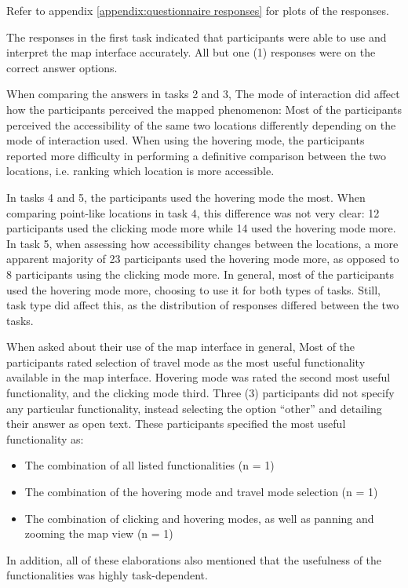 Refer to appendix \ref{appendix:questionnaire responses} for plots of the responses.

The responses in the first task indicated that participants were
able to use and interpret the map interface accurately.
All but one (1) responses
were on the correct answer options.

When comparing the answers in tasks 2 and 3,
The mode of interaction did affect how the participants perceived the mapped phenomenon:
Most of the participants perceived
the accessibility of the same two locations
differently depending on the mode of interaction used.
When using the hovering mode, the participants reported more difficulty in
performing a definitive comparison between the two locations,
i.e. ranking which location is more accessible.

In tasks 4 and 5,
the participants used the hovering mode the most.
When comparing point-like locations in task 4,
this difference was not very clear:
12 participants used the clicking mode more while 14 used the hovering mode more.
In task 5, when assessing how accessibility changes between the locations,
a more apparent majority of 23 participants used the hovering mode more,
as opposed to 8 participants using the clicking mode more.
In general,
most of the participants used the hovering mode more,
choosing to use it for both types of tasks.
Still,
task type did affect this,
as the distribution of responses differed between the two tasks.

When asked about their use of the map interface in general,
Most of the participants rated selection of travel mode as
the most useful functionality available in the map interface.
Hovering mode was rated the second most useful functionality,
and the clicking mode third.
Three (3) participants did not specify any particular functionality,
instead selecting the option \enquote{other}
and detailing their answer as open text.
These participants specified the most useful functionality as:
\begin{itemize}
	\item The combination of all listed functionalities (n = 1)
	\item The combination of the hovering mode and travel mode selection (n = 1)
	\item The combination of clicking and hovering modes, as well as panning and zooming the map view (n = 1)
\end{itemize}
In addition,
all of these elaborations also mentioned
that the usefulness of the functionalities was highly task-dependent.

